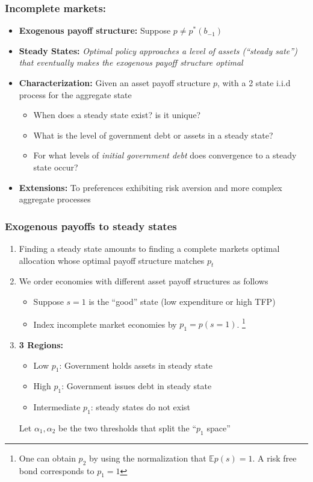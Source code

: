 \documentclass{beamer}
\begin{document}
\begin{frame}
	\frametitle{Incomplete markets:}
	\begin{itemize}
		\item  \textbf{Exogenous payoff structure:} Suppose $p\neq p^*(b_{-1})$
		\item \textbf{Steady States: }\emph{Optimal policy approaches a level of assets (``steady
		sate'') that eventually  makes the exogenous payoff structure optimal}
		
		\item \textbf{Characterization: } Given an asset payoff structure $p$, with  a 2 state i.i.d process for the aggregate state
		\begin{itemize}
			\item When does a steady state exist? is it unique?
			\item What is the level of government debt or   assets in a steady state?
			\item For what levels of  \emph{initial government debt} does  convergence to a steady state occur?
 			\end{itemize}
		\item  \textbf{Extensions: } To preferences exhibiting risk aversion and more complex aggregate processes
	\end{itemize}
\end{frame}

 \begin{frame}
  \frametitle{Exogenous payoffs to steady states}
  \begin{enumerate}
   \item Finding a steady state amounts to finding a complete markets optimal allocation whose optimal payoff structure matches $p_t$
  \item We order  economies with different asset payoff structures as follows
  \begin{itemize}
   \item  Suppose $s=1$ is the ``good'' state (low expenditure or high TFP)
   \item Index incomplete market economies by $p_1=p(s=1)$. \footnote{ One can obtain $p_2$ by using the normalization that $\mathbb{E}p(s)=1$. A risk free bond corresponds to $p_1=1$}
    \end{itemize}
  \item \textbf{3 Regions: }
  \begin{itemize}
   \item Low $p_1$: Government holds assets in steady state
   \item High $p_1$: Government  issues debt  in steady state
   \item Intermediate $p_1$: steady states do not exist
  \end{itemize}
Let $\alpha_1,\alpha_2$ be the two thresholds   that split the ``$p_1$ space''
  \end{enumerate}

 \end{frame}
\end{document}

